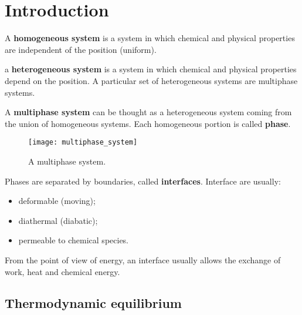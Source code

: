 
\chapter{Introduction}
A \textbf{homogeneous system} is a system in which chemical and physical
properties are independent of the position (uniform).

a \textbf{heterogeneous system} is a system in which chemical and physical
properties depend on the position. A particular set of heterogeneous systems are
multiphase systems.

A \textbf{multiphase system} can be thought as a heterogeneous system coming
from the union of homogeneous systems. Each homogeneous portion is called
\textbf{phase}.

\begin{figure}[htp]
    \centering
    \texttt{[image: multiphase\_system]}
    \caption{A multiphase system.}
\end{figure}

Phases are separated by boundaries, called \textbf{interfaces}. Interface are
usually:
\begin{itemize}
    \item deformable (moving);
    \item diathermal (diabatic);
    \item permeable to chemical species.
\end{itemize}

From the point of view of energy, an interface usually allows the exchange of
work, heat and chemical energy.

\section{Thermodynamic equilibrium}
